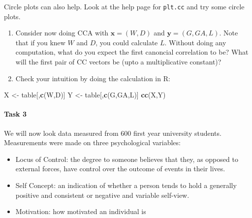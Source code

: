 \documentclass[
]{book}
\newenvironment{Shaded}{\begin{snugshade}}{\end{snugshade}}
\newcommand{\FunctionTok}[1]{\textcolor[rgb]{0.13,0.29,0.53}{\textbf{#1}}}
\newcommand{\NormalTok}[1]{#1}
\newcommand{\OtherTok}[1]{\textcolor[rgb]{0.56,0.35,0.01}{#1}}
\newcommand{\StringTok}[1]{\textcolor[rgb]{0.31,0.60,0.02}{#1}}
\providecommand{\tightlist}{%
  \setlength{\itemsep}{0pt}\setlength{\parskip}{0pt}}
\theoremstyle{definition}
\theoremstyle{definition}
\theoremstyle{definition}
\theoremstyle{definition}
\theoremstyle{remark}
\begin{document}
Circle plots can also help. Look at the help page for \texttt{plt.cc} and try some circle plots.

\begin{enumerate}
\def\labelenumi{\roman{enumi}.}
\setcounter{enumi}{2}
\item
  Consider now doing CCA with \(\mathbf x=(W,D)\) and \(\mathbf y=(G,GA, L)\). Note that if you knew \(W\) and \(D\), you could calculate \(L\). Without doing any computation, what do you expect the first canoncial correlation to be? What will the first pair of CC vectors be (upto a multiplicative constant)?
\item
  Check your intuition by doing the calculation in R:
\end{enumerate}

\begin{Shaded}
\begin{Highlighting}[]
\NormalTok{X }\OtherTok{\textless{}{-}}\NormalTok{ table[,}\FunctionTok{c}\NormalTok{(}\StringTok{\textquotesingle{}W\textquotesingle{}}\NormalTok{,}\StringTok{\textquotesingle{}D\textquotesingle{}}\NormalTok{)] }
\NormalTok{Y }\OtherTok{\textless{}{-}}\NormalTok{ table[,}\FunctionTok{c}\NormalTok{(}\StringTok{\textquotesingle{}G\textquotesingle{}}\NormalTok{,}\StringTok{\textquotesingle{}GA\textquotesingle{}}\NormalTok{,}\StringTok{\textquotesingle{}L\textquotesingle{}}\NormalTok{)] }
\FunctionTok{cc}\NormalTok{(X,Y)}
\end{Highlighting}
\end{Shaded}

\hypertarget{task-3}{%
\paragraph*{Task 3}\label{task-3}}

We will now look data measured from 600 first year university students. Measurements were made on three psychological variables:

\begin{itemize}
\tightlist
\item
  Locus of Control: the degree to someone believes that they, as opposed to external forces, have control over the outcome of events in their lives.
\item
  Self Concept: an indication of whether a person tends to hold a generally positive and consistent or negative and variable self-view.
\item
  Motivation: how motivated an individual is
\end{itemize}
\end{document}
